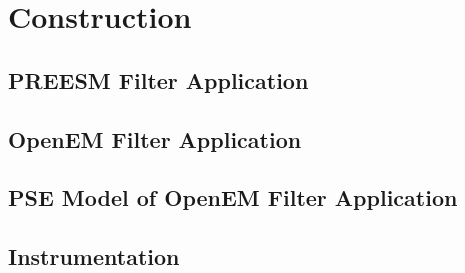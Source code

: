\chapter{Construction}
\label{chapter:construction}
\section{PREESM Filter Application}
\section{OpenEM Filter Application}
\section{PSE Model of OpenEM Filter Application}
\section{Instrumentation}
